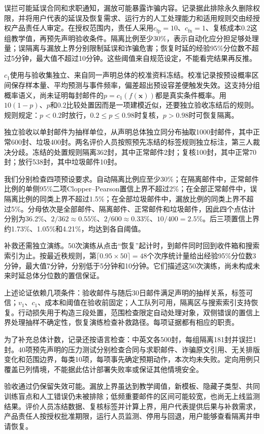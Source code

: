 误拦可能延误合同和求职通知，漏放可能暴露诈骗内容。记录据此排除永久删除权限，并将用户代表的延误及恢复需求、运行方的人工处理能力和适用规则交由经授权产品责任人审定。在授权范围内，责任人采用$c_{\mathrm{fp}}=10$、$c_{\mathrm{fn}}=1$、复核成本$0.2$这组教学值，再预先声明验收条件。隔离比例至少30\%，表示自动化应分担足够处理量；误隔离与漏放上界分别限制延误和诈骗危害；恢复时延的经验95\%分位数不超过5分钟，最大值不超过10分钟。这些阈值来自规范设定，不能看完结果再反推。

$c_1$使用与验收集独立、来自同一声明总体的校准资料冻结。校准记录按预设概率区间保存样本量、平均预测与事件频率，偏差超出预设容差便触发失效。这支持分组概率语义，尚未证明每封邮件的$p=c_1(f(\bm x))$都是真实条件概率。用$10(1-p)$、$p$和$0.2$比较处置因而是一项建模近似，还要独立验收冻结后的规则。规则规定：$p<0.2$时放行，$0.2\leq p\leq0.98$时复核，$p>0.98$时可恢复隔离。

独立验收以单封邮件为抽样单位，从声明总体独立同分布抽取1000封邮件，其中正常600封、垃圾400封。两名评价人员按照预先冻结的标签规则独立标注，第三人裁决分歧。冻结的处置规则隔离362封，其中正常邮件2封；复核100封，其中正常70封；放行538封，其中垃圾邮件10封。

我们分别检查四项预设要求。自动隔离比例应至少30\%；在隔离邮件中，正常邮件比例的单侧95\%二项Clopper--Pearson置信上界不超过2\%；在全部正常邮件中，误隔离比例的同类上界不超过1.5\%；在全部垃圾邮件中，漏放比例的同类上界不超过5\%。分母依次是全部邮件、隔离邮件、正常邮件和垃圾邮件，因此四个点估计分别为36.2\%、$2/362\approx0.55\%$、$2/600\approx0.33\%$、$10/400=2.5\%$。后三项置信上界约1.73\%、1.05\%和4.21\%，均达到各自阈值。

补救还需独立演练。50次演练从点击“恢复”起计时，到邮件同时回到收件箱和搜索索引为止。按最近秩规则，第$\lceil0.95\times50\rceil=48$个次序统计量给出经验95\%分位数3分钟，最大值7分钟，分别低于5分钟和10分钟。它们描述这50次演练，尚未构成未来时延总体分位数的置信保证。

上述论证依赖几项条件：验收邮件与随后30日邮件满足声明的抽样关系，标签可信；$v_1$、$c_1$、成本和阈值在验收前固定；人工队列可用，隔离区与搜索索引支持恢复。行动损失用于构造三段处置，范围检查限定自动处理对象，双侧错误的置信上界处理抽样不确定性，恢复演练检查补救路径。每项证据都有相应的职责。

为了补充总体计数，记录还按语言检查：中英文各500封，每组隔离181封并误拦1封。40项预先声明的压力测试分别检查合同与求职邮件、诈骗原文引用、无关排版变化和范围边界，每类10项，每项事先确定预期动作，本次均未失败。定向用例只覆盖已列情境，不能据此估计部署失败率或保证其他情境安全。

验收通过仍保留失效可能。漏放上界虽达到教学阈值，新模板、隐藏子类型、共同训练盲点和人工错误仍未被排除；低频重要邮件的区间可能较宽，也尚无上线监测结果。评价人员冻结数据、复核标签并计算上界，用户代表提供后果与补救需求，产品责任人按授权批准期限，运行人员监测、停用与回退，用户能够查看隔离并申请恢复。

